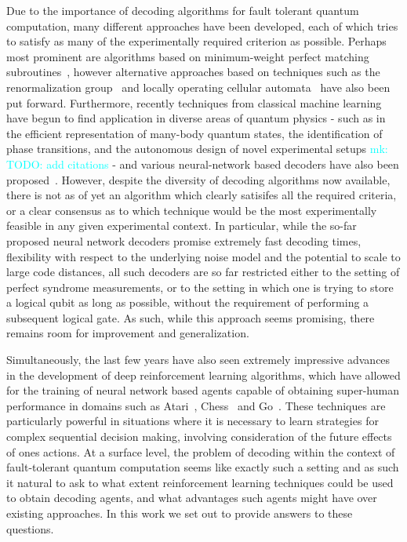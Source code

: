 \documentclass[onecolumn,preprintnumbers,amsmath,amssymb,notitlepage,nofootinbib,longbibliography,superscriptaddress,aps,pra,10pt]{revtex4-1}
\newcommand{\mk}[1]{\textcolor{Cyan}{mk: #1}}
\begin{document}
	Due to the importance of decoding algorithms for fault tolerant quantum computation, many different approaches have been developed, each of which tries to satisfy as many of the experimentally required criterion as possible.
	Perhaps most prominent are algorithms based on minimum-weight perfect matching subroutines~\cite{Fowler13}, however alternative approaches based on techniques such as the renormalization group~\cite{Duclos2010} and locally operating cellular automata~\cite{Herold15} have also been put forward.
	Furthermore, recently techniques from classical machine learning have begun to find application in diverse areas of quantum physics - such as in the efficient representation of many-body quantum states, the identification of phase transitions, and the autonomous design of novel experimental setups \mk{TODO: add citations} - and various neural-network based decoders have also been proposed~\cite{Torlai10, Varsamopoulos17, Krastanov17, Breuckmann18, Baireuther18a, Baireuther18b, Ni18}.
	However, despite the diversity of decoding algorithms now available, there is not as of yet an algorithm which clearly satisifes all the required criteria, or a clear consensus as to which technique would be the most experimentally feasible in any given experimental context.
	In particular, while the so-far proposed neural network decoders promise extremely fast decoding times, flexibility with respect to the underlying noise model and the potential to scale to large code distances, all such decoders are so far restricted either to the setting of perfect syndrome measurements, or to the setting in which one is trying to store a logical qubit as long as possible, without the requirement of performing a subsequent logical gate.
	As such, while this approach seems promising, there remains room for improvement and generalization.

	Simultaneously, the last few years have also seen extremely impressive advances in the development of deep reinforcement learning algorithms, which have allowed for the training of neural network based agents capable of obtaining super-human performance in domains such as Atari~\cite{Mnih13}, Chess~\cite{Silver17a} and Go~\cite{Silver17b}.
	These techniques are particularly powerful in situations where it is necessary to learn strategies for complex sequential decision making, involving consideration of the future effects of ones actions.
	At a surface level, the problem of decoding within the context of fault-tolerant quantum computation seems like exactly such a setting and as such it natural to ask to what extent reinforcement learning techniques could be used to obtain decoding agents, and what advantages such agents might have over existing approaches.
	In this work we set out to provide answers to these questions.
\end{document}
